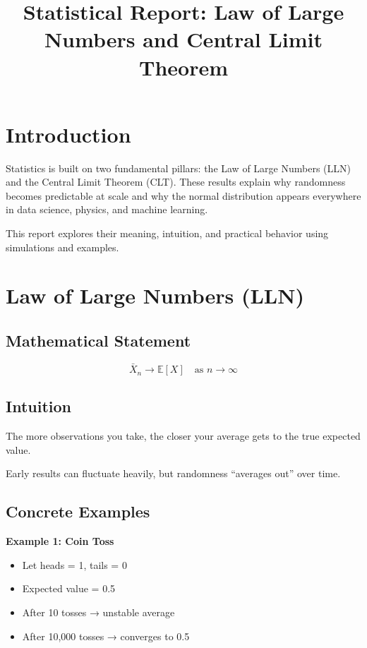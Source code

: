\documentclass[a4paper,12pt]{article}
\title{\textbf{Statistical Report: Law of Large Numbers and Central Limit Theorem}}
\author{}
\date{}
\begin{document}
\maketitle

\section{Introduction}

Statistics is built on two fundamental pillars: the Law of Large Numbers (LLN) and the Central Limit Theorem (CLT). These results explain why randomness becomes predictable at scale and why the normal distribution appears everywhere in data science, physics, and machine learning.

This report explores their meaning, intuition, and practical behavior using simulations and examples.

\section{Law of Large Numbers (LLN)}

\subsection{Mathematical Statement}

\[
\bar{X}_n \rightarrow \mathbb{E}[X] \quad \text{as } n \to \infty
\]

\subsection{Intuition}

\begin{tcolorbox}
The more observations you take, the closer your average gets to the true expected value.
\end{tcolorbox}

Early results can fluctuate heavily, but randomness “averages out” over time.

\subsection{Concrete Examples}

\textbf{Example 1: Coin Toss}
\begin{itemize}
\item Let heads = 1, tails = 0
\item Expected value = 0.5
\item After 10 tosses → unstable average
\item After 10,000 tosses → converges to 0.5
\end{itemize}
\end{document}
